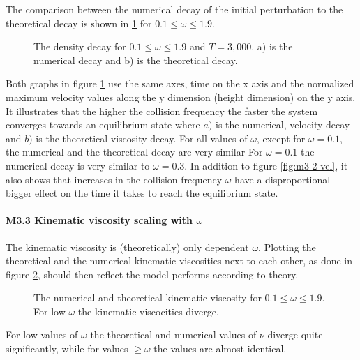 \documentclass[a4paper,12pt, oneside]{book}
\begin{document}
The comparison between the numerical decay of the initial perturbation to the theoretical decay is shown in \ref{fig:m3-2-norm-vel} for $0.1 \leq \omega \leq 1.9 $.
\begin{figure}[ht]
\centering
\resizebox{\columnwidth}{!}{\large}
\vspace*{-10mm}
\caption[Normalized density decay]{The density decay for $0.1 \leq \omega \leq 1.9 $ and $T=3,000$. a) is the numerical decay and b) is the theoretical decay.}
\label{fig:m3-2-norm-vel}
\end{figure}
Both graphs in figure \ref{fig:m3-2-norm-vel} use the same axes, time on the x axis and the normalized maximum velocity values along the y dimension (height dimension) on the y axis.
It illustrates that the higher the collision frequency the faster the system converges towards an equilibrium state where $a)$ is the numerical, velocity decay and $b)$ is the theoretical viscosity decay.
For all values of $\omega$, except for $\omega=0.1$, the numerical and the theoretical decay are very similar
For $\omega=0.1$ the numerical decay is very similar to $\omega=0.3$.
In addition to figure \ref{fig:m3-2-vel}, it also shows that  increases in the collision frequency $\omega$ have a disproportional bigger effect on the time it takes to reach the equilibrium state.


\paragraph{M3.3 Kinematic viscosity scaling with $\omega$}
The kinematic viscosity is (theoretically) only dependent $\omega$. 
Plotting the theoretical and the numerical kinematic viscosities next to each other, as done in figure \ref{fig:m3-3-kinematic-viscocity}, should then reflect the model performs according to theory. 
\begin{figure}[ht]
\centering
\resizebox{0.8\columnwidth}{!}{\large}
\caption[Kinematic viscosity]{The numerical and theoretical kinematic viscosity for $0.1 \leq \omega \leq 1.9 $. For low $\omega$ the kinematic viscocities diverge.}
\label{fig:m3-3-kinematic-viscocity}
\end{figure}
For low values of $\omega$ the theoretical and numerical values of $\nu$ diverge quite significantly, while for values $\geq\omega$ the values are almost identical.
\end{document}
